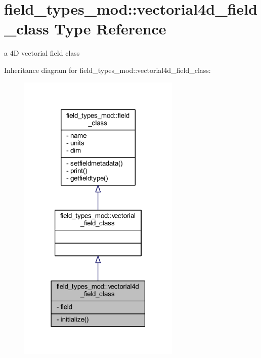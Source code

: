 \hypertarget{structfield__types__mod_1_1vectorial4d__field__class}{}\section{field\+\_\+types\+\_\+mod\+:\+:vectorial4d\+\_\+field\+\_\+class Type Reference}
\label{structfield__types__mod_1_1vectorial4d__field__class}


a 4D vectorial field class  




Inheritance diagram for field\+\_\+types\+\_\+mod\+:\+:vectorial4d\+\_\+field\+\_\+class\+:
\nopagebreak
\begin{figure}[H]
\begin{center}
\leavevmode
\includegraphics[width=219pt]{structfield__types__mod_1_1vectorial4d__field__class__inherit__graph}
\end{center}
\end{figure}


